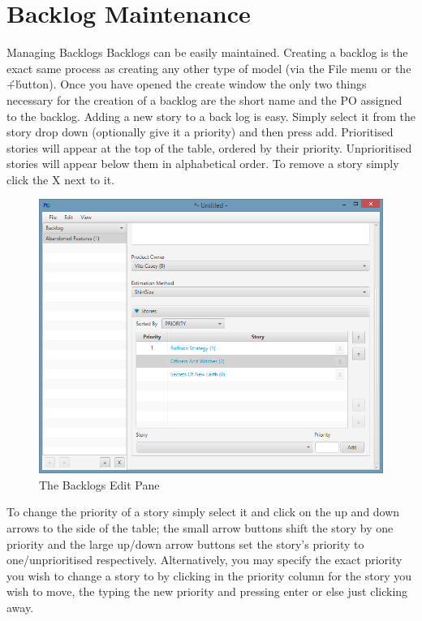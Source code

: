 \section{Backlog Maintenance}

Managing Backlogs
\newline\newline
Backlogs can be easily maintained. Creating a backlog is the exact same process as creating any other type of model (via the File menu or the \'+\' button). Once you have opened the create window the only two things necessary for the creation of a backlog are the short name and the PO assigned to the backlog.
\newline
Adding a new story to a back log is easy. Simply select it from the story drop down (optionally give it a priority) and then press add. Prioritised stories will appear at the top of the table, ordered by their priority. Unprioritised stories will appear below them in alphabetical order. To remove a story simply click the X next to it.

\begin{figure}[H]
\centering
\includegraphics[width=\textwidth]{images/screenshots/backlogs.PNG}
\caption{The Backlogs Edit Pane}
\label{fig:new_project}
\end{figure}

\bigskip
To change the priority of a story simply select it and click on the up and down arrows to the side of the table; the small arrow buttons shift the story by one priority and the large up/down arrow buttons set the story's priority to one/unprioritised respectively. Alternatively, you may specify the exact priority you wish to change a story to by clicking in the priority column for the story you wish to move, the typing the new priority and pressing enter or else just clicking away.

